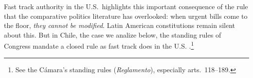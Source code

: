 \documentclass[letter,12pt]{article}
\begin{document}


Fast track authority in the U.S.\ highlights this important consequence of the rule that the comparative politics literature has overlooked: when urgent bills come to the floor, \emph{they cannot be modified}. Latin American constitutions remain silent about this. But in Chile, the case we analize below, the standing rules of Congress mandate a closed rule as fast track does in the U.S. \citep{sotoCongChile2015}.\footnote{See the Cámara's standing rules (\emph{Reglamento}), especially arts.\ 118--189.} 
\end{document}

